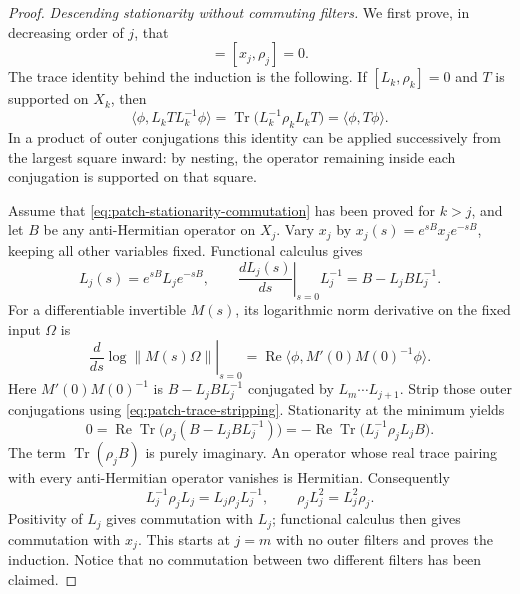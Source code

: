 \documentclass[11pt]{article}
\numberwithin{equation}{section}
\theoremstyle{definition}
\theoremstyle{remark}
\DeclareMathOperator{\Tr}{Tr}
\newcommand{\norm}[1]{\lVert #1\rVert}
\begin{document}
\begin{proof}
\emph{Descending stationarity without commuting filters.}
We first prove, in decreasing order of \(j\), that
\begin{equation}
 [L_j,\rho_j]=[x_j,\rho_j]=0.
 \label{eq:patch-stationarity-commutation}
\end{equation}
The trace identity behind the induction is the following.  If
\([L_k,\rho_k]=0\) and \(T\) is supported on \(X_k\), then
\begin{equation}
 \langle\phi,L_k T L_k^{-1}\phi\rangle
   =\Tr\bigl(L_k^{-1}\rho_k L_k T\bigr)
   =\langle\phi,T\phi\rangle .
 \label{eq:patch-trace-stripping}
\end{equation}
In a product of outer conjugations this identity can be applied
successively from the largest square inward: by nesting, the operator
remaining inside each conjugation is supported on that square.

Assume that \eqref{eq:patch-stationarity-commutation} has been proved
for \(k>j\), and let \(B\) be any anti-Hermitian operator on \(X_j\).
Vary \(x_j\) by \(x_j(s)=e^{sB}x_j e^{-sB}\), keeping all other
variables fixed.  Functional calculus gives
\[
 L_j(s)=e^{sB}L_j e^{-sB},\qquad
 \left.\frac{dL_j(s)}{ds}\right|_{s=0}L_j^{-1}
       =B-L_j B L_j^{-1}.
\]
For a differentiable invertible \(M(s)\), its logarithmic norm
derivative on the fixed input \(\Omega\) is
\[
 \left.\frac{d}{ds}\log\norm{M(s)\Omega}\right|_{s=0}
   =\operatorname{Re}
       \langle\phi,M'(0)M(0)^{-1}\phi\rangle .
\]
Here \(M'(0)M(0)^{-1}\) is \(B-L_j B L_j^{-1}\) conjugated
by \(L_m\cdots L_{j+1}\).  Strip those outer conjugations using
\eqref{eq:patch-trace-stripping}.  Stationarity at the minimum yields
\[
 0=\operatorname{Re}\Tr\bigl(\rho_j(B-L_j B L_j^{-1})\bigr)
   =-\operatorname{Re}\Tr\bigl(L_j^{-1}\rho_jL_j B\bigr).
\]
The term \(\Tr(\rho_jB)\) is purely imaginary.  An operator whose
real trace pairing with every anti-Hermitian operator vanishes is
Hermitian.  Consequently
\[
 L_j^{-1}\rho_jL_j=L_j\rho_jL_j^{-1},
 \qquad
 \rho_jL_j^2=L_j^2\rho_j .
\]
Positivity of \(L_j\) gives commutation with \(L_j\); functional
calculus then gives commutation with \(x_j\).  This starts at \(j=m\)
with no outer filters and proves the induction.  Notice that no
commutation between two different filters has been claimed.


\end{proof}
\end{document}
